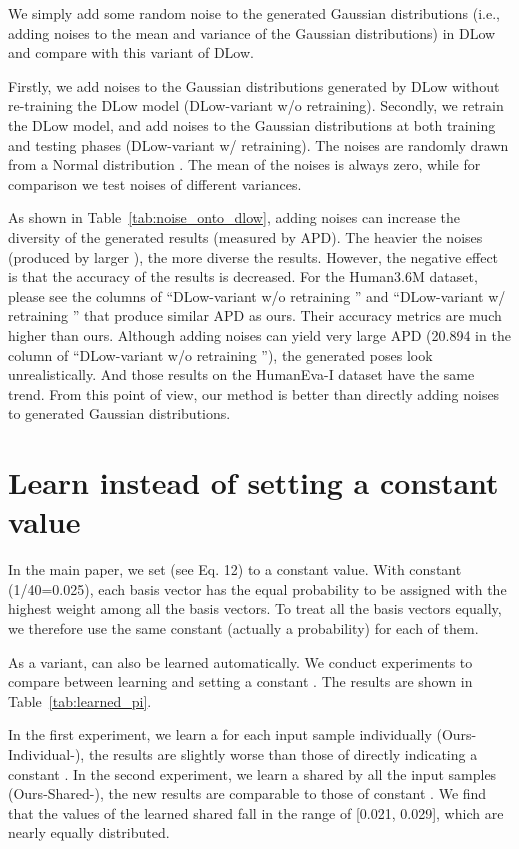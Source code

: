 \documentclass[sigconf,screen,nonacm]{acmart}
\begin{document}
	We simply add some random noise to the generated Gaussian distributions (i.e., adding noises to the mean and variance of the Gaussian distributions) in DLow \cite{yuan2020dlow} and compare with this variant of DLow.
	




	Firstly, we add noises to the Gaussian distributions generated by DLow without re-training the DLow model (DLow-variant w/o retraining). Secondly, we retrain the DLow model, and add noises to the Gaussian distributions at both training and testing phases (DLow-variant w/ retraining). The noises are randomly drawn from a Normal distribution . The mean of the noises is always zero, while for comparison we test noises of different variances.
	
	As shown in Table~\ref{tab:noise_onto_dlow}, adding noises can increase the diversity of the generated results (measured by APD). The heavier the noises (produced by larger ), the more diverse the results. However, the negative effect is that the accuracy of the results is decreased. For the Human3.6M dataset, please see the columns of ``DLow-variant w/o retraining '' and ``DLow-variant w/ retraining '' that produce similar APD as ours. Their accuracy metrics are much higher than ours. Although adding noises can yield very large APD (20.894 in the column of ``DLow-variant w/o retraining ''), the generated poses look unrealistically. And those results on the HumanEva-I dataset have the same trend. From this point of view, our method is better than directly adding noises to generated Gaussian distributions.
	
	\section{Learn  instead of setting a constant value}
	In the main paper, we set  (see Eq. 12) to a constant value. With constant  (1/40=0.025), each basis vector has the equal probability to be assigned with the highest weight among all the basis vectors. To treat all the basis vectors equally, we therefore use the same constant  (actually a probability) for each of them.
	
	As a variant,  can also be learned automatically. We conduct experiments to compare between learning and setting a constant . The results are shown in Table~\ref{tab:learned_pi}.
	
	
	In the first experiment, we learn a  for each input sample individually (Ours-Individual-), the results are slightly worse than those of directly indicating a constant . In the second experiment, we learn a  shared by all the input samples (Ours-Shared-), the new results are comparable to those of constant . We find that the values of the learned shared  fall in the range of [0.021, 0.029], which are nearly equally distributed.
	
\end{document}
